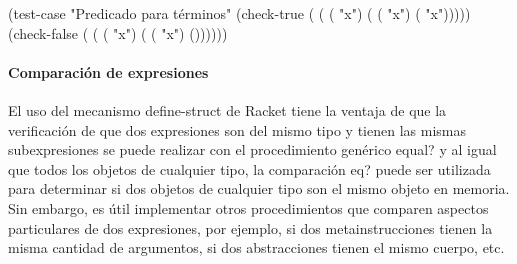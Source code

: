 \documentclass[letterpaper, twoside, openright, 11pt]{book}%
\begin{document}
\nwenddocs{}\plusendmoddef\nwstartdeflinemarkup{}\nwenddeflinemarkup
(test-case "Predicado para términos"
  (check-true
   ( ( ( "x")
                          ( ( "x") ( "x")))))
  (check-false
   ( ( ( "x") ( ( "x") ())))))
\nwendcode{}\nwdocspar

\paragraph{Comparación de expresiones} El uso del mecanismo {\Tt{}define-struct\nwendquote} de {\Tt{}Racket\nwendquote} tiene la ventaja de que la verificación de que dos expresiones son del mismo tipo y tienen las mismas subexpresiones se puede realizar con el procedimiento genérico {\Tt{}equal?\nwendquote} y al igual que todos los objetos de cualquier tipo, la comparación {\Tt{}eq?\nwendquote} puede ser utilizada para determinar si dos objetos de cualquier tipo son el mismo objeto en memoria. Sin embargo, es útil implementar otros procedimientos que comparen aspectos particulares de dos expresiones, por ejemplo, si dos metainstrucciones tienen la misma cantidad de argumentos, si dos abstracciones tienen el mismo cuerpo, etc.
\end{document}
